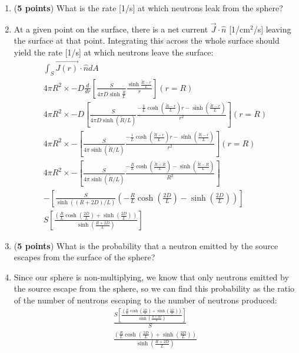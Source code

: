 \documentclass[11pt]{article}
\newcommand{\ans}[1]{{\color{violet}#1}}
\begin{document}
\begin{enumerate}
\item[(b)] ({\bf 5 points}) What is the rate [1/s] at which neutrons leak from the sphere?
\item[] \ans{
    At a given point on the surface, there is a net current $\vec{J}\cdot\hat{n}$ [1/cm$^2$/s] leaving the surface at that point.
    Integrating this across the whole surface should yield the rate [1/s] at which neutrons leave the surface:
    \begin{gather*}
        \int_S \vec{J(r)}\cdot\hat{n} dA \\
        4\pi R^2\times-D\frac{d}{dr}\left[\frac{S}{4\pi D\sinh{\frac{\tilde{R}}{L}}}\frac{\sinh{\frac{\tilde{R}-r}{L}}}{r}\right](r=R) \\
        4\pi R^2\times-D\left[\frac{S}{4\pi D\sinh(\tilde{R}/L)}\frac{-\frac{1}{L}\cosh\left(\frac{\tilde{R}-r}{L}\right)r-\sinh\left(\frac{\tilde{R}-r}{L}\right)}{r^{2}}\right](r=R) \\
        4\pi R^2\times-\left[\frac{S}{4\pi \sinh(\tilde{R}/L)}\frac{-\frac{1}{L}\cosh\left(\frac{\tilde{R}-r}{L}\right)r-\sinh\left(\frac{\tilde{R}-r}{L}\right)}{r^{2}}\right](r=R) \\
        4\pi R^2\times-\left[\frac{S}{4\pi \sinh(\tilde{R}/L)}\frac{-\frac{R}{L}\cosh\left(\frac{\tilde{R}-R}{L}\right)-\sinh\left(\frac{\tilde{R}-R}{L}\right)}{R^{2}}\right] \\
        -\left[\frac{S}{\sinh((R+2D)/L)}\left({-\frac{R}{L}\cosh\left(\frac{2D}{L}\right)-\sinh\left(\frac{2D}{L}\right)}\right)\right] \\
        \boxed{S\left[\frac{\left({\frac{R}{L}\cosh\left(\frac{2D}{L}\right)+\sinh\left(\frac{2D}{L}\right)}\right)}{\sinh(\frac{R+2D}{L})}\right]}
    \end{gather*}
}
\item[(c)] ({\bf 5 points}) What is the probability that a neutron emitted by the source escapes from the surface of the sphere?
\item[] \ans{
    Since our sphere is non-multiplying, we know that only neutrons emitted by the source escape from the sphere, so we can find this probability as the ratio of the number of neutrons escaping to the number of neutrons produced:
    \begin{gather*}
        \frac{S\left[\frac{\left({\frac{R}{L}\cosh\left(\frac{2D}{L}\right)+\sinh\left(\frac{2D}{L}\right)}\right)}{\sinh(\frac{R+2D}{L})}\right]}{S} \\
        \boxed{\frac{\left({\frac{R}{L}\cosh\left(\frac{2D}{L}\right)+\sinh\left(\frac{2D}{L}\right)}\right)}{\sinh(\frac{R+2D}{L})}}

\end{gather*}}
\end{enumerate}
\end{document}
